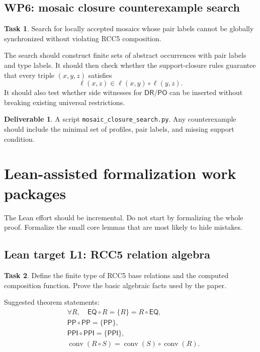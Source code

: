 \documentclass[11pt]{article}
\newcommand{\EQ}{\mathsf{EQ}}
\newcommand{\PP}{\mathsf{PP}}
\newcommand{\PPI}{\mathsf{PPI}}
\newcommand{\PO}{\mathsf{PO}}
\newcommand{\DR}{\mathsf{DR}}
\theoremstyle{definition}
\newtheorem{task}{Task}
\newtheorem{deliverable}{Deliverable}
\theoremstyle{plain}
\begin{document}
\subsection{WP6: mosaic closure counterexample search}

\begin{task}
Search for locally accepted mosaics whose pair labels cannot be globally synchronized without violating RCC5 composition.
\end{task}

The search should construct finite sets of abstract occurrences with pair labels and type labels.  It should then check whether the support-closure rules guarantee that every triple \((x,y,z)\) satisfies
\[
\ell(x,z)\in \ell(x,y)\circ \ell(y,z).
\]
It should also test whether side witnesses for \(\DR/\PO\) can be inserted without breaking existing universal restrictions.

\begin{deliverable}
A script \texttt{mosaic\_closure\_search.py}.  Any counterexample should include the minimal set of profiles, pair labels, and missing support condition.
\end{deliverable}

\section{Lean-assisted formalization work packages}

The Lean effort should be incremental.  Do not start by formalizing the whole proof.  Formalize the small core lemmas that are most likely to hide mistakes.

\subsection{Lean target L1: RCC5 relation algebra}

\begin{task}
Define the finite type of RCC5 base relations and the computed composition function.  Prove the basic algebraic facts used by the paper.
\end{task}

Suggested theorem statements:
\begin{align*}
&\forall R,\quad \EQ\circ R = \{R\}= R\circ\EQ, \\
&\PP\circ\PP = \{\PP\}, \\
&\PPI\circ\PPI = \{\PPI\}, \\
&\operatorname{conv}(R\circ S)=\operatorname{conv}(S)\circ\operatorname{conv}(R).
\end{align*}
\end{document}
